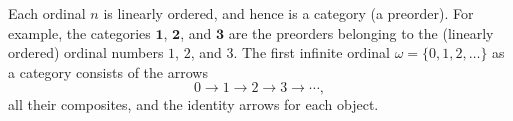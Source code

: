 Each ordinal $n$ is linearly ordered, and hence is a category (a preorder). For example, the categories $\mathbf{1}$, $\mathbf{2}$, and $\mathbf{3}$ are the preorders belonging to the (linearly ordered) ordinal numbers $1$, $2$, and $3$. The first infinite ordinal $\omega = \{0, 1, 2, \ldots\}$ as a category consists of the arrows
$$
0 \to 1 \to 2 \to 3 \to \cdots,
$$
all their composites, and the identity arrows for each object.
